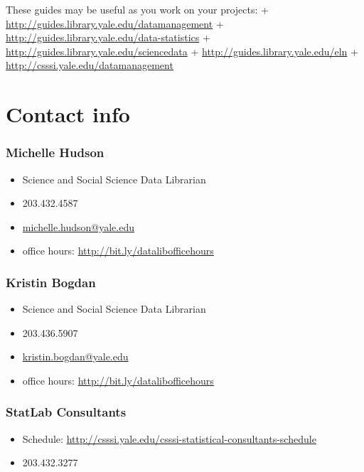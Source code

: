 \documentclass[]{article}
\begin{document}
These guides may be useful as you work on your projects: +
\url{http://guides.library.yale.edu/datamanagement} +
\url{http://guides.library.yale.edu/data-statistics} +
\url{http://guides.library.yale.edu/sciencedata} +
\url{http://guides.library.yale.edu/eln} +
\url{http://csssi.yale.edu/datamanagement}

\section{Contact info}\label{contact-info}

\subsubsection{Michelle Hudson}\label{michelle-hudson}

\begin{itemize}
\itemsep1pt\parskip0pt
\item
  Science and Social Science Data Librarian
\item
  203.432.4587
\item
  \url{michelle.hudson@yale.edu}
\item
  office hours: \url{http://bit.ly/datalibofficehours}
\end{itemize}

\subsubsection{Kristin Bogdan}\label{kristin-bogdan}

\begin{itemize}
\itemsep1pt\parskip0pt
\item
  Science and Social Science Data Librarian
\item
  203.436.5907
\item
  \url{kristin.bogdan@yale.edu}
\item
  office hours: \url{http://bit.ly/datalibofficehours}
\end{itemize}

\subsubsection{StatLab Consultants}\label{statlab-consultants-1}

\begin{itemize}
\itemsep1pt\parskip0pt
\item
  Schedule:
  \url{http://csssi.yale.edu/csssi-statistical-consultants-schedule}
\item
  203.432.3277
\end{itemize}
\end{document}

